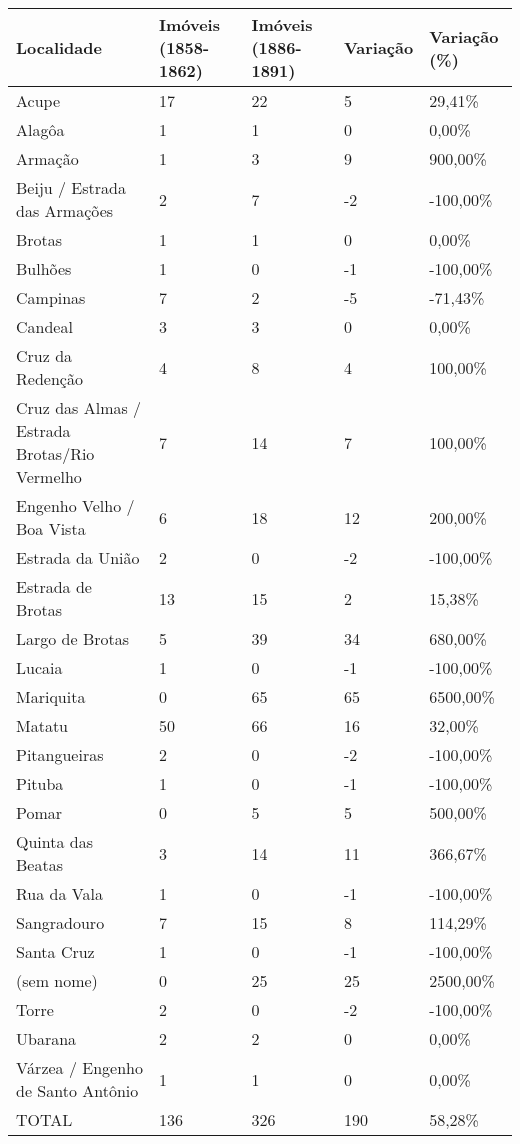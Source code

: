 \begin{table}
\centering
{}
{
\begin{tabular}{m{4cm}llll}
\toprule
Localidade	& Imóveis (1858-1862)	& Imóveis (1886-1891)	& Variação	& Variação (\%) \\
\midrule \midrule
Acupe	& 17	& 22	& 5	& 29,41\% \\
Alagôa	& 1	& 1	& 0	& 0,00\% \\
Armação	& 1	& 3	& 9	& 900,00\% \\
Beiju / Estrada das Armações	& 2	& 7	& -2	& -100,00\% \\
Brotas	& 1	& 1	& 0	& 0,00\% \\
Bulhões	& 1	& 0	& -1	& -100,00\% \\
Campinas	& 7	& 2	& -5	& -71,43\% \\
Candeal	& 3	& 3	& 0	& 0,00\% \\
Cruz da Redenção	& 4	& 8	& 4	& 100,00\% \\
Cruz das Almas / Estrada Brotas/Rio Vermelho	& 7	& 14	& 7	& 100,00\% \\
Engenho Velho / Boa Vista	& 6	& 18	& 12	& 200,00\% \\
Estrada da União	& 2	& 0	& -2	& -100,00\% \\
Estrada de Brotas	& 13	& 15	& 2	& 15,38\% \\
Largo de Brotas	& 5	& 39	& 34	& 680,00\% \\
Lucaia	& 1	& 0	& -1	& -100,00\% \\
Mariquita	& 0	& 65	& 65	& 6500,00\% \\
Matatu	& 50	& 66	& 16	& 32,00\% \\
Pitangueiras	& 2	& 0	& -2	& -100,00\% \\
Pituba	& 1	& 0	& -1	& -100,00\% \\
Pomar	& 0	& 5	& 5	& 500,00\% \\
Quinta das Beatas	& 3	& 14	& 11	& 366,67\% \\
Rua da Vala	& 1	& 0	& -1	& -100,00\% \\
Sangradouro	& 7	& 15	& 8	& 114,29\% \\
Santa Cruz	& 1	& 0	& -1	& -100,00\% \\
(sem nome)	& 0	& 25	& 25	& 2500,00\% \\
Torre	& 2	& 0	& -2	& -100,00\% \\
Ubarana	& 2	& 2	& 0	& 0,00\% \\
Várzea / Engenho de Santo Antônio	& 1	& 1	& 0	& 0,00\% \\
\midrule
TOTAL	& 136	& 326	& 190	& 58,28\% \\
\bottomrule
\end{tabular} 
}
{}
\end{table}